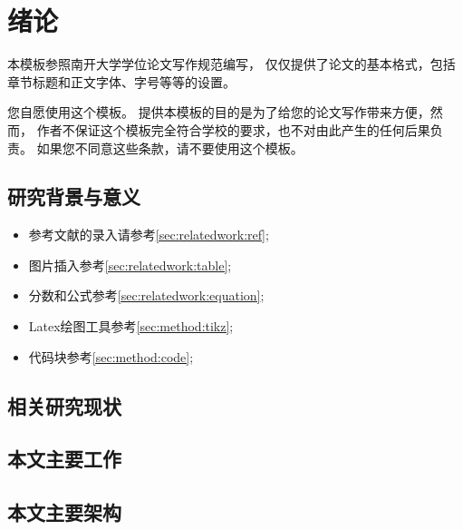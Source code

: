 
\chapter{绪论}
\label{chpt:introduction}


本模板参照南开大学学位论文写作规范编写，
仅仅提供了论文的基本格式，包括章节标题和正文字体、字号等等的设置。



您自愿使用这个模板。
提供本模板的目的是为了给您的论文写作带来方便，然而，
作者不保证这个模板完全符合学校的要求，也不对由此产生的任何后果负责。
如果您不同意这些条款，请不要使用这个模板。


\section{研究背景与意义}

\begin{itemize}
  \item 参考文献的录入请参考\ref{sec:relatedwork:ref};
  \item 图片插入参考\ref{sec:relatedwork:table};
  \item 分数和公式参考\ref{sec:relatedwork:equation};  
  \item Latex绘图工具参考\ref{sec:method:tikz};
  \item 代码块参考\ref{sec:method:code}; 
\end{itemize}

\section{相关研究现状}
\section{本文主要工作}
\section{本文主要架构}
